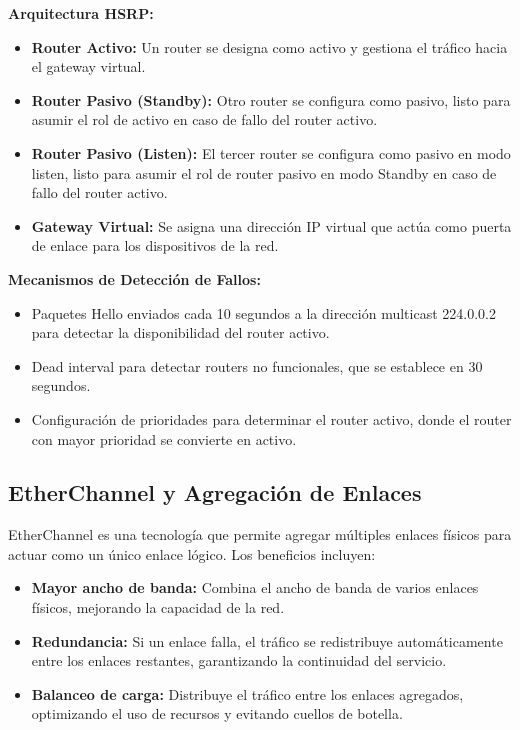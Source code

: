 \textbf{Arquitectura HSRP:}
\begin{itemize}
    \item \textbf{Router Activo:} Un router se designa como activo y gestiona el tráfico hacia el gateway virtual.
    \item \textbf{Router Pasivo (Standby):} Otro router se configura como pasivo, listo para asumir el rol de activo en caso de fallo del router activo.
    \item \textbf{Router Pasivo (Listen):} El tercer router se configura como pasivo en modo listen, listo para asumir el rol de router pasivo en modo Standby en caso de fallo del router activo.
    \item \textbf{Gateway Virtual:} Se asigna una dirección IP virtual que actúa como puerta de enlace para los dispositivos de la red.
\end{itemize}
\textbf{Mecanismos de Detección de Fallos:}
\begin{itemize}
    \item Paquetes Hello enviados cada 10 segundos a la dirección multicast 224.0.0.2 para detectar la disponibilidad del router activo.
    \item Dead interval para detectar routers no funcionales, que se establece en 30 segundos.
    \item Configuración de prioridades para determinar el router activo, donde el router con mayor prioridad se convierte en activo.
\end{itemize}

\subsection{EtherChannel y Agregación de Enlaces}
\label{subsec:etherchannel}
EtherChannel es una tecnología que permite agregar múltiples enlaces físicos para actuar como un único enlace lógico. Los beneficios incluyen:

\begin{itemize}
    \item \textbf{Mayor ancho de banda:} Combina el ancho de banda de varios enlaces físicos, mejorando la capacidad de la red.
    \item \textbf{Redundancia:} Si un enlace falla, el tráfico se redistribuye automáticamente entre los enlaces restantes, garantizando la continuidad del servicio.
    \item \textbf{Balanceo de carga:} Distribuye el tráfico entre los enlaces agregados, optimizando el uso de recursos y evitando cuellos de botella.
\end{itemize}

